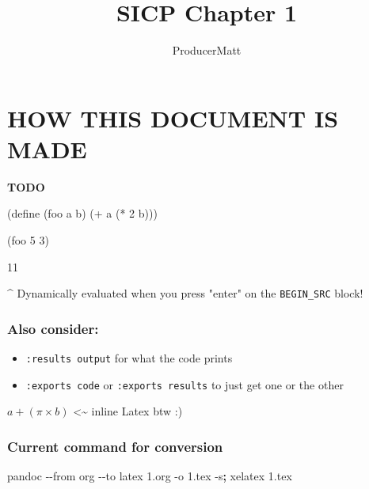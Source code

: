 \documentclass[
]{article}
\title{SICP Chapter 1}
\author{ProducerMatt}
\date{}
\newenvironment{Shaded}{}{}
\newcommand{\AttributeTok}[1]{\textcolor[rgb]{0.49,0.56,0.16}{#1}}
\newcommand{\DecValTok}[1]{\textcolor[rgb]{0.25,0.63,0.44}{#1}}
\newcommand{\ExtensionTok}[1]{#1}
\newcommand{\FunctionTok}[1]{\textcolor[rgb]{0.02,0.16,0.49}{#1}}
\newcommand{\KeywordTok}[1]{\textcolor[rgb]{0.00,0.44,0.13}{\textbf{#1}}}
\newcommand{\NormalTok}[1]{#1}
\newcommand{\OperatorTok}[1]{\textcolor[rgb]{0.40,0.40,0.40}{#1}}
\providecommand{\tightlist}{%
  \setlength{\itemsep}{0pt}\setlength{\parskip}{0pt}}
\begin{document}
\maketitle

\hypertarget{how-this-document-is-made}{%
\section{HOW THIS DOCUMENT IS MADE}\label{how-this-document-is-made}}

\textbf{\textbf{TODO}}

\hypertarget{testing}{%
\label{testing}}%
\begin{Shaded}
\begin{Highlighting}[numbers=left,,]
\NormalTok{(}\ExtensionTok{define}\FunctionTok{ }\NormalTok{(foo a b)}
\NormalTok{  (}\OperatorTok{+}\NormalTok{ a (}\OperatorTok{*} \DecValTok{2}\NormalTok{ b)))}

\NormalTok{(foo }\DecValTok{5} \DecValTok{3}\NormalTok{)}
\end{Highlighting}
\end{Shaded}

11

\^{} Dynamically evaluated when you press "enter" on the
\texttt{BEGIN\_SRC} block!

\hypertarget{also-consider}{%
\subsubsection{Also consider:}\label{also-consider}}

\begin{itemize}
\tightlist
\item
  \texttt{:results\ output} for what the code prints
\item
  \texttt{:exports\ code} or \texttt{:exports\ results} to just get one
  or the other
\end{itemize}

\(a + (\pi \times b)\) \textless\textasciitilde{} inline Latex btw :)

\hypertarget{current-command-for-conversion}{%
\subsubsection{Current command for
conversion}\label{current-command-for-conversion}}

\begin{Shaded}
\begin{Highlighting}[]
\ExtensionTok{pandoc} \AttributeTok{{-}{-}from}\NormalTok{ org }\AttributeTok{{-}{-}to}\NormalTok{ latex 1.org }\AttributeTok{{-}o}\NormalTok{ 1.tex }\AttributeTok{{-}s}\KeywordTok{;} \ExtensionTok{xelatex}\NormalTok{ 1.tex}
\end{Highlighting}
\end{Shaded}
\end{document}
